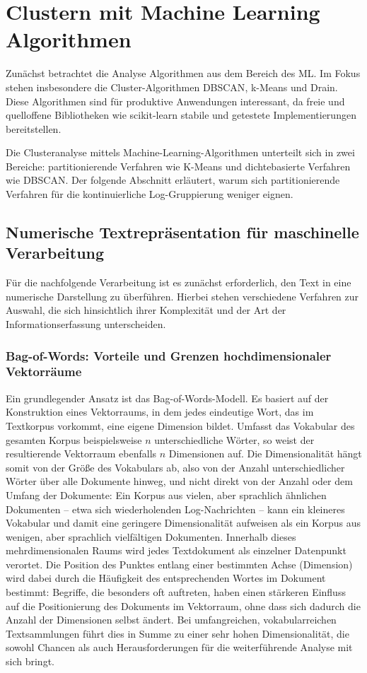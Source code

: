 

\chapter{Clustern mit Machine Learning Algorithmen}
\label{chap:ml}

Zunächst betrachtet die Analyse Algorithmen aus dem Bereich des \ac{ML}. Im Fokus stehen insbesondere die Cluster-Algorithmen \ac{DBSCAN}, k-Means und Drain. Diese Algorithmen sind für produktive Anwendungen interessant, da freie und quelloffene Bibliotheken wie scikit-learn stabile und getestete Implementierungen bereitstellen.

Die Clusteranalyse mittels Machine-Learning-Algorithmen unterteilt sich in zwei Bereiche: partitionierende Verfahren wie K-Means und dichtebasierte Verfahren wie DBSCAN. Der folgende Abschnitt erläutert, warum sich partitionierende Verfahren für die kontinuierliche Log-Gruppierung weniger eignen.

\section{Numerische Textrepräsentation für maschinelle Verarbeitung}
Für die nachfolgende Verarbeitung ist es zunächst erforderlich, den Text in eine numerische Darstellung zu überführen. Hierbei stehen verschiedene Verfahren zur Auswahl, die sich hinsichtlich ihrer Komplexität und der Art der Informationserfassung unterscheiden.

\subsection{Bag-of-Words: Vorteile und Grenzen hochdimensionaler Vektorräume}

Ein grundlegender Ansatz ist das Bag-of-Words-Modell.\cite{IBMBagOfWords} Es basiert auf der Konstruktion eines Vektorraums, in dem jedes eindeutige Wort, das im Textkorpus vorkommt, eine eigene Dimension bildet. Umfasst das Vokabular des gesamten Korpus beispielsweise $n$ unterschiedliche Wörter, so weist der resultierende Vektorraum ebenfalls $n$ Dimensionen auf. Die Dimensionalität hängt somit von der Größe des Vokabulars ab, also von der Anzahl unterschiedlicher Wörter über alle Dokumente hinweg, und nicht direkt von der Anzahl oder dem Umfang der Dokumente: Ein Korpus aus vielen, aber sprachlich ähnlichen Dokumenten -- etwa sich wiederholenden Log-Nachrichten -- kann ein kleineres Vokabular und damit eine geringere Dimensionalität aufweisen als ein Korpus aus wenigen, aber sprachlich vielfältigen Dokumenten. Innerhalb dieses mehrdimensionalen Raums wird jedes Textdokument als einzelner Datenpunkt verortet. Die Position des Punktes entlang einer bestimmten Achse (Dimension) wird dabei durch die Häufigkeit des entsprechenden Wortes im Dokument bestimmt: Begriffe, die besonders oft auftreten, haben einen stärkeren Einfluss auf die Positionierung des Dokuments im Vektorraum, ohne dass sich dadurch die Anzahl der Dimensionen selbst ändert. Bei umfangreichen, vokabularreichen Textsammlungen führt dies in Summe zu einer sehr hohen Dimensionalität, die sowohl Chancen als auch Herausforderungen für die weiterführende Analyse mit sich bringt.


